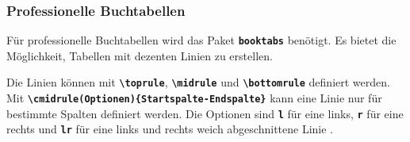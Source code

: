 \subsubsection{Professionelle Buchtabellen}
Für professionelle Buchtabellen wird das Paket \textbf{\texttt{booktabs}} benötigt. Es bietet die Möglichkeit, Tabellen mit dezenten Linien zu erstellen.

Die Linien können mit \textbf{\texttt{\textbackslash toprule}}, \textbf{\texttt{\textbackslash midrule}} und \textbf{\texttt{\textbackslash bottomrule}} definiert werden. Mit \newline \textbf{\texttt{\textbackslash cmidrule(Optionen)\{Startspalte-Endspalte\}}} kann eine Linie nur für bestimmte Spalten definiert werden. Die Optionen sind  \textbf{\texttt{l}} für eine links, \textbf{\texttt{r}} für eine rechts und \textbf{\texttt{lr}} für eine links und rechts weich abgeschnittene Linie .

